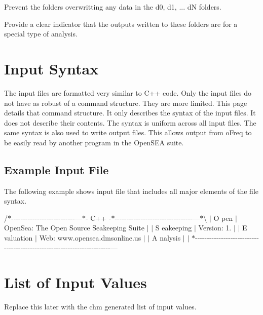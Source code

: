 \begin{DoxyEnumerate}
\item Prevent the folders overwritting any data in the d0, d1, ... d\-N folders.
\item Provide a clear indicator that the outputs written to these folders are for a special type of analysis. 
\end{DoxyEnumerate}\hypertarget{input_syntax}{}\section{Input Syntax}\label{input_syntax}
The input files are formatted very similar to C++ code. Only the input files do not have as robust of a command structure. They are more limited. This page details that command structure. It only describes the syntax of the input files. It does not describe their contents. The syntax is uniform across all input files. The same syntax is also used to write output files. This allows output from o\-Freq to be easily read by another program in the Open\-S\-E\-A suite.\hypertarget{input_syntax_example1}{}\subsection{Example Input File}\label{input_syntax_example1}
The following example shows input file that includes all major elements of the file syntax.

/$\ast$-\/-\/-\/-\/-\/-\/-\/-\/-\/-\/-\/-\/-\/-\/-\/-\/-\/-\/-\/-\/-\/-\/-\/-\/-\/-\/-\/---$\ast$-\/ C++ -\/$\ast$-\/-\/-\/-\/-\/-\/-\/-\/-\/-\/-\/-\/-\/-\/-\/-\/-\/-\/-\/-\/-\/-\/-\/-\/-\/-\/-\/-\/-\/-\/-\/-\/-\/---$\ast$\textbackslash{} $|$ O pen $|$ Open\-Sea\-: The Open Source Seakeeping Suite $|$ $|$ S eakeeping $|$ Version\-: 1. $|$ $|$ E valuation $|$ Web\-: www.\-opensea.\-dmsonline.\-us $|$ $|$ A nalysis $|$ $|$ $\ast$-\/-\/-\/-\/-\/-\/-\/-\/-\/-\/-\/-\/-\/-\/-\/-\/-\/-\/-\/-\/-\/-\/-\/-\/-\/-\/-\/-\/-\/-\/-\/-\/-\/-\/-\/-\/-\/-\/-\/-\/-\/-\/-\/-\/-\/-\/-\/-\/-\/-\/-\/-\/-\/-\/-\/-\/-\/-\/-\/-\/-\/-\/-\/-\/-\/-\/-\/-\/-\/-\/-\/-\/--- \hypertarget{input_values}{}\section{List of Input Values}\label{input_values}
Replace this later with the chm generated list of input values. 